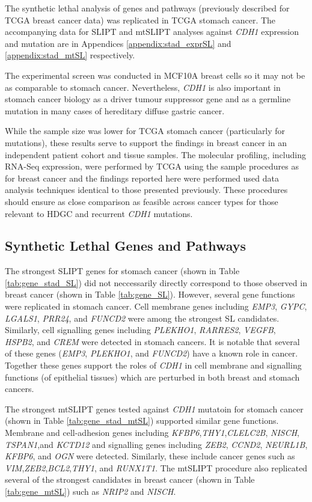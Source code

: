 The synthetic lethal analysis of genes and pathways (previously described for TCGA breast cancer data) was replicated in TCGA stomach cancer. The accompanying data for SLIPT and mtSLIPT analyses against \textit{CDH1} expression and mutation are in Appendices \ref{appendix:stad_exprSL} and \ref{appendix:stad_mtSL} respectively.

The experimental screen \citep{Telford2015} was conducted in MCF10A breast cells so it may not be as comparable to stomach cancer. Nevertheless, \textit{CDH1} is also important in stomach cancer biology as a driver tumour suppressor gene and as a germline mutation in many cases of hereditary diffuse gastric cancer.

While the sample size was lower for TCGA stomach cancer (particularly for mutations), these results serve to support the findings in breast cancer in an independent patient cohort and tissue samples. The molecular profiling, including RNA-Seq expression, were performed by TCGA using the sample procedures as for breast cancer and the findings reported here were performed used data analysis techniques identical to those presented previously. These procedures should ensure as close comparison as feasible across cancer types for those relevant to HDGC and recurrent \textit{CDH1} mutations.

\subsection{Synthetic Lethal Genes and Pathways} \label{chapt3:stad_SL_genes}

The strongest SLIPT genes for stomach cancer (shown in Table \ref{tab:gene_stad_SL}) did not neccessarily directly correspond to those observed in breast cancer (shown in Table \ref{tab:gene_SL}). However, several gene functions were replicated in stomach cancer. Cell membrane genes including \textit{EMP3}, \textit{GYPC},  \textit{LGALS1}, \textit{PRR24},  and \textit{FUNCD2} were among the strongest SL candidates. Similarly, cell signalling genes including \textit{PLEKHO1}, \textit{RARRES2}, \textit{VEGFB}, \textit{HSPB2}, and \textit{CREM} were detected in stomach cancers. It is notable that several of these genes (\textit{EMP3}, \textit{PLEKHO1}, and \textit{FUNCD2}) have a known role in cancer. Together these genes support the roles of \textit{CDH1} in cell membrane and signalling functions (of epithelial tissues) which are perturbed in both breast and stomach cancers.

The strongest mtSLIPT genes tested against \textit{CDH1} mutatoin for stomach cancer (shown in Table \ref{tab:gene_stad_mtSL}) supported similar gene functions. Membrane and cell-adhesion genes including \textit{KFBP6},\textit{THY1},\textit{CLELC2B}, \textit{NISCH}, \textit{TSPAN1},and \textit{KCTD12} and signalling genes including \textit{ZEB2}, \textit{CCND2}, \textit{NEURL1B}, \textit{KFBP6}, and \textit{OGN} were detected. Similarly, these include cancer genes such as \textit{VIM},\textit{ZEB2},\textit{BCL2},\textit{THY1}, and \textit{RUNX1T1}. The mtSLIPT procedure also replicated several of the strongest candidates in breast cancer (shown in Table \ref{tab:gene_mtSL}) such as \textit{NRIP2} and \textit{NISCH}.

